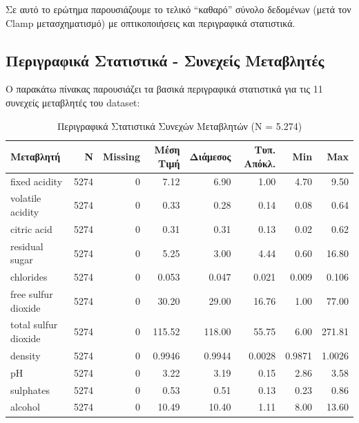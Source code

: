 \documentclass[12pt,a4paper]{article}
\begin{document}
Σε αυτό το ερώτημα παρουσιάζουμε το τελικό ``καθαρό'' σύνολο δεδομένων (μετά τον Clamp μετασχηματισμό) με οπτικοποιήσεις και περιγραφικά στατιστικά.

\subsection{Περιγραφικά Στατιστικά - Συνεχείς Μεταβλητές}

Ο παρακάτω πίνακας παρουσιάζει τα βασικά περιγραφικά στατιστικά για τις 11 συνεχείς μεταβλητές του dataset:

\begin{table}[H]
\centering
\caption{Περιγραφικά Στατιστικά Συνεχών Μεταβλητών (N = 5.274)}
\label{tab:desc_continuous}
\scriptsize
\begin{tabular}{lrrrrrrr}
\toprule
\textbf{Μεταβλητή} & \textbf{N} & \textbf{Missing} & \textbf{Μέση Τιμή} & \textbf{Διάμεσος} & \textbf{Τυπ. Απόκλ.} & \textbf{Min} & \textbf{Max} \\
\midrule
fixed acidity & 5274 & 0 & 7.12 & 6.90 & 1.00 & 4.70 & 9.50 \\
volatile acidity & 5274 & 0 & 0.33 & 0.28 & 0.14 & 0.08 & 0.64 \\
citric acid & 5274 & 0 & 0.31 & 0.31 & 0.13 & 0.02 & 0.62 \\
residual sugar & 5274 & 0 & 5.25 & 3.00 & 4.44 & 0.60 & 16.80 \\
chlorides & 5274 & 0 & 0.053 & 0.047 & 0.021 & 0.009 & 0.106 \\
free sulfur dioxide & 5274 & 0 & 30.20 & 29.00 & 16.76 & 1.00 & 77.00 \\
total sulfur dioxide & 5274 & 0 & 115.52 & 118.00 & 55.75 & 6.00 & 271.81 \\
density & 5274 & 0 & 0.9946 & 0.9944 & 0.0028 & 0.9871 & 1.0026 \\
pH & 5274 & 0 & 3.22 & 3.19 & 0.15 & 2.86 & 3.58 \\
sulphates & 5274 & 0 & 0.53 & 0.51 & 0.13 & 0.23 & 0.86 \\
alcohol & 5274 & 0 & 10.49 & 10.40 & 1.11 & 8.00 & 13.60 \\
\bottomrule
\end{tabular}
\end{table}
\end{document}

